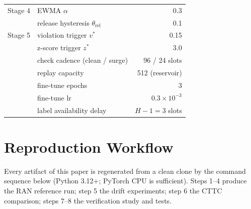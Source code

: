 \begin{table}[!t]
\begin{tabular}{@{}llr@{}}
\midrule
Stage 4 & EWMA $\alpha$ & 0.3 \\
        & release hysteresis $\theta_{\text{rel}}$ & 0.1 \\
\midrule
Stage 5 & violation trigger $v^{*}$ & 0.15 \\
        & z-score trigger $z^{*}$ & 3.0 \\
        & check cadence (clean / surge) & 96 / 24 slots \\
        & replay capacity & 512 (reservoir) \\
        & fine-tune epochs & 3 \\
        & fine-tune lr & $0.3 \times 10^{-3}$ \\
        & label availability delay & $H{-}1 = 3$ slots \\
\bottomrule
\end{tabular}
\end{table}

\section{Reproduction Workflow}
\label{app:repro}

Every artifact of this paper is regenerated from a clean clone by the
command sequence below (Python 3.12+; PyTorch CPU is sufficient).
Steps 1--4 produce the RAN reference run; step 5 the drift
experiments; step 6 the CTTC comparison; steps 7--8 the verification
study and tests.

